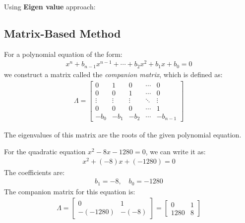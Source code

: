 \documentclass[journal]{IEEEtran}
\begin{document}
Using \textbf{Eigen value} approach:
\subsection*{Matrix-Based Method}
For a polynomial equation of the form:
\begin{align}
    x^n + b_{n-1}x^{n-1} + \cdots + b_2x^2 + b_1x + b_0 = 0
\end{align}
we construct a matrix called the \textit{companion matrix}, which is defined as:
\begin{align}
    \Lambda =
    \begin{bmatrix}
        0 & 1 & 0 & \cdots & 0 \\
        0 & 0 & 1 & \cdots & 0 \\
        \vdots & \vdots & \vdots & \ddots & \vdots \\
        0 & 0 & 0 & \cdots & 1 \\
        -b_0 & -b_1 & -b_2 & \cdots & -b_{n-1}
    \end{bmatrix}
\end{align}

The eigenvalues of this matrix are the roots of the given polynomial equation.

For the quadratic equation $x^2 - 8x - 1280 = 0 $, we can write it as:
\begin{align}
    x^2 + (-8)x + (-1280) = 0
\end{align}
The coefficients are:
\begin{align}
    b_1 = -8, \quad b_0 = -1280
\end{align}
The companion matrix for this equation is:
\begin{align}
    \Lambda =
    \begin{bmatrix}
        0 & 1 \\
        -(-1280) & -(-8)
    \end{bmatrix}
    =
    \begin{bmatrix}
        0 & 1 \\
        1280 & 8
    \end{bmatrix}
\end{align}
\end{document}
